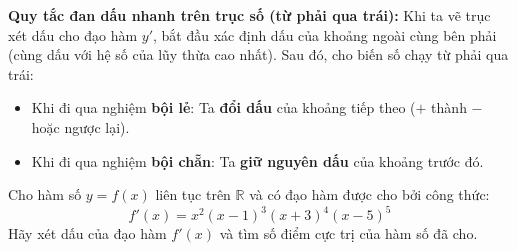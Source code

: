 \documentclass[12pt]{article}
\begin{document}
	\textbf{Quy tắc đan dấu nhanh trên trục số (từ phải qua trái):}
	Khi ta vẽ trục xét dấu cho đạo hàm $y'$, bắt đầu xác định dấu của khoảng ngoài cùng bên phải (cùng dấu với hệ số của lũy thừa cao nhất). Sau đó, cho biến số chạy từ phải qua trái:
	\begin{itemize}
		\item Khi đi qua nghiệm \textbf{bội lẻ}: Ta \textbf{đổi dấu} của khoảng tiếp theo ($+$ thành $-$ hoặc ngược lại).
		\item Khi đi qua nghiệm \textbf{bội chẵn}: Ta \textbf{giữ nguyên dấu} của khoảng trước đó.
	\end{itemize}
	
	\begin{vidu}[2]
		Cho hàm số $y = f(x)$ liên tục trên $\mathbb{R}$ và có đạo hàm được cho bởi công thức:
		$$f'(x) = x^2(x - 1)^3(x + 3)^4(x - 5)^5$$
		Hãy xét dấu của đạo hàm $f'(x)$ và tìm số điểm cực trị của hàm số đã cho.
	\end{vidu}
	
\end{document}
